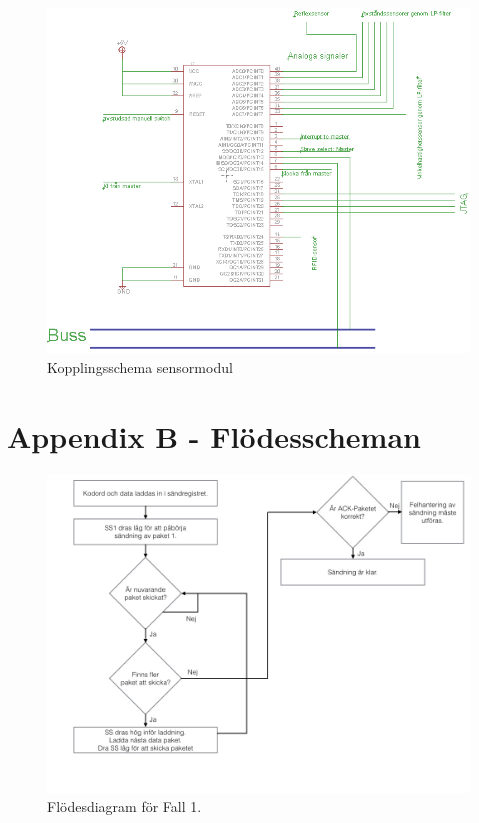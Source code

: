\documentclass[a4paper,12pt,fleqn]{article}
\begin{document}
\begin{figure}[ht] %
  \begin{center}
  \includegraphics[keepaspectratio=true,width=\linewidth]{bilder/sensormodulkoppling.png}  %
  \end{center}
  \caption{Kopplingsschema sensormodul} %
  \label{fig:kopplingsensor} %
\end{figure}
 \clearpage %
 

\newpage
\section{Appendix B - Flödesscheman}

\begin{figure}[htp] %
  \begin{center}
  \includegraphics[keepaspectratio=true,width=\linewidth]{bilder/SPIbild002.jpg}  %
  \end{center}
  \caption{Flödesdiagram för Fall 1.} %
  \label{fig:case1flow}
\end{figure}
\end{document}
